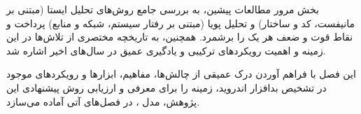 بخش مرور مطالعات پیشین، به بررسی جامع روش‌های تحلیل ایستا (مبتنی بر مانیفست، کد و ساختار) و تحلیل پویا (مبتنی بر رفتار سیستم، شبکه و منابع) پرداخت و نقاط قوت و ضعف هر یک را برشمرد. همچنین، به تاریخچه مختصری از تلاش‌ها در این زمینه و اهمیت رویکردهای ترکیبی و یادگیری عمیق در سال‌های اخیر اشاره شد.

این فصل با فراهم آوردن درک عمیقی از چالش‌ها، مفاهیم، ابزارها و رویکردهای موجود در تشخیص بدافزار اندروید، زمینه را برای معرفی و ارزیابی روش پیشنهادی این پژوهش، مدل ، در فصل‌های آتی آماده می‌سازد.


